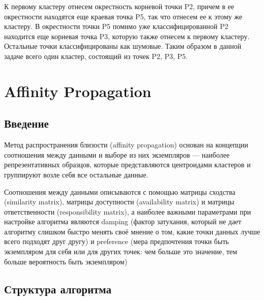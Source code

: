 К первому кластеру отнесем окрестность корневой точки P2, причем в ее окрестности находятся еще краевая точка P5, так что отнесем ее к этому же кластеру. В окрестности точки P5 помимо уже классифицированной P2 находится еще корневая точка P3, которую также отнесем к первому кластеру. Остальные точки классифицированы как шумовые. Таким образом в данной задаче всего один кластер, состоящий из точек P2, P3, P5.


\section{Affinity Propagation}

\subsection{Введение}

Метод распространения близости (affinity propagation) основан на концепции соотношения между данными и выборе из них экземпляров — наиболее репрезентативных образцов, которые представляются центроидами кластеров и группируют возле себя все остальные данные. 

Соотношения между данными описываются с помощью матрицы сходства (similarity matrix), матрицы доступности (availability matrix) и матрицы ответственности (responsibility matrix), а наиболее важными параметрами при настройке алгоритма являются damping (фактор затухания, который не дает алгоритму слишком быстро менять своё мнение о том, какие точки данных лучше всего подходят друг другу) и preference (мера предпочтения точки быть экземпляром для себя или для других точек: чем больше это значение, тем больше вероятность быть экземпляром)

\subsection{Структура алгоритма}


